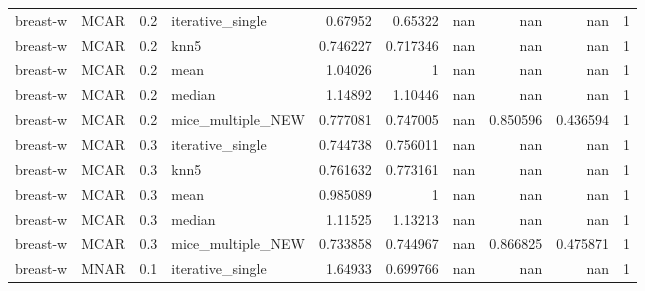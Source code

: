 \begin{table}[ht]
\begin{tabular}{llrlrrrrrr}
 breast-w        & MCAR        &         0.2 & iterative\_single  &       0.67952  &             0.65322  &            nan         &                       nan        &                    nan         &         1 \\
 breast-w        & MCAR        &         0.2 & knn5              &       0.746227 &             0.717346 &            nan         &                       nan        &                    nan         &         1 \\
 breast-w        & MCAR        &         0.2 & mean              &       1.04026  &             1        &            nan         &                       nan        &                    nan         &         1 \\
 breast-w        & MCAR        &         0.2 & median            &       1.14892  &             1.10446  &            nan         &                       nan        &                    nan         &         1 \\
 breast-w        & MCAR        &         0.2 & mice\_multiple\_NEW &       0.777081 &             0.747005 &            nan         &                         0.850596 &                      0.436594  &         1 \\
 breast-w        & MCAR        &         0.3 & iterative\_single  &       0.744738 &             0.756011 &            nan         &                       nan        &                    nan         &         1 \\
 breast-w        & MCAR        &         0.3 & knn5              &       0.761632 &             0.773161 &            nan         &                       nan        &                    nan         &         1 \\
 breast-w        & MCAR        &         0.3 & mean              &       0.985089 &             1        &            nan         &                       nan        &                    nan         &         1 \\
 breast-w        & MCAR        &         0.3 & median            &       1.11525  &             1.13213  &            nan         &                       nan        &                    nan         &         1 \\
 breast-w        & MCAR        &         0.3 & mice\_multiple\_NEW &       0.733858 &             0.744967 &            nan         &                         0.866825 &                      0.475871  &         1 \\
 breast-w        & MNAR        &         0.1 & iterative\_single  &       1.64933  &             0.699766 &            nan         &                       nan        &                    nan         &         1 \\

\end{tabular}
\end{table}
